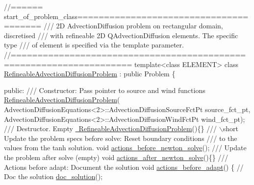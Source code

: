  
\begin{DoxyCodeInclude}
\textcolor{comment}{//====== start\_of\_problem\_class=======================================}
\textcolor{comment}{/// 2D AdvectionDiffusion problem on rectangular domain, discretised }
\textcolor{comment}{}\textcolor{comment}{/// with refineable 2D QAdvectionDiffusion elements. The specific type}
\textcolor{comment}{}\textcolor{comment}{/// of element is specified via the template parameter.}
\textcolor{comment}{}\textcolor{comment}{//====================================================================}
\textcolor{keyword}{template}<\textcolor{keyword}{class} ELEMENT> 
\textcolor{keyword}{class }\hyperlink{classRefineableAdvectionDiffusionProblem}{RefineableAdvectionDiffusionProblem} : \textcolor{keyword}{public} Problem
\{

\textcolor{keyword}{public}:
\textcolor{comment}{}
\textcolor{comment}{ /// Constructor: Pass pointer to source and wind functions}
\textcolor{comment}{} \hyperlink{classRefineableAdvectionDiffusionProblem_a515147bf0907ad339811955edb89817c}{RefineableAdvectionDiffusionProblem}(
  AdvectionDiffusionEquations<2>::AdvectionDiffusionSourceFctPt source\_fct\_pt,
  AdvectionDiffusionEquations<2>::AdvectionDiffusionWindFctPt wind\_fct\_pt);
\textcolor{comment}{}
\textcolor{comment}{ /// Destructor. Empty}
\textcolor{comment}{} \hyperlink{classRefineableAdvectionDiffusionProblem_ae746646f6c255dca13e5abe9fcf85fe3}{~RefineableAdvectionDiffusionProblem}()\{\}
\textcolor{comment}{}
\textcolor{comment}{ /// \(\backslash\)short Update the problem specs before solve: Reset boundary conditions}
\textcolor{comment}{ /// to the values from the tanh solution.}
\textcolor{comment}{} \textcolor{keywordtype}{void} \hyperlink{classRefineableAdvectionDiffusionProblem_a7cbcaa45fd7e932f335cc07a83b4d3e2}{actions\_before\_newton\_solve}();
\textcolor{comment}{}
\textcolor{comment}{ /// Update the problem after solve (empty)}
\textcolor{comment}{} \textcolor{keywordtype}{void} \hyperlink{classRefineableAdvectionDiffusionProblem_a949296e60bc661fbd523974055a93f8b}{actions\_after\_newton\_solve}()\{\}
\textcolor{comment}{}
\textcolor{comment}{ /// Actions before adapt: Document the solution}
\textcolor{comment}{} \textcolor{keywordtype}{void} \hyperlink{classRefineableAdvectionDiffusionProblem_a3470a408c458e5500ac614b8f0e65634}{actions\_before\_adapt}()
  \{
   \textcolor{comment}{// Doc the solution}
   \hyperlink{classRefineableAdvectionDiffusionProblem_a735d7fdd587d4730ffe1113b11ca3b56}{doc\_solution}();
   

\end{DoxyCodeInclude}
